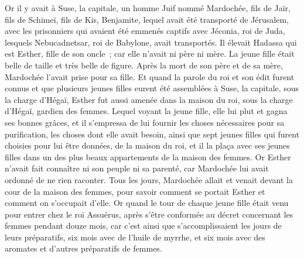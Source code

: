 \begin{multicols}{2}
Or il y avait à Suse, la capitale, un homme Juif nommé Mardochée, fils de Jaïr, fils de Schimeï, fils de Kis, Benjamite,
lequel avait été transporté de Jérusalem, avec les prisonniers qui avaient été emmenés captifs avec Jéconia, roi de Juda, lesquels Nebucadnetsar, roi de Babylone, avait transportés.
Il élevait Hadassa qui est Esther, fille de son oncle~; car elle n'avait ni père ni mère. La jeune fille était belle de taille et très belle de figure. Après la mort de son père et de sa mère, Mardochée l'avait prise pour sa fille.
Et quand la parole du roi et son édit furent connus et que plusieurs jeunes filles eurent été assemblées à Suse, la capitale, sous la charge d'Hégaï, Esther fut aussi amenée dans la maison du roi, sous la charge d'Hégaï, gardien des femmes.
Lequel voyant la jeune fille, elle lui plut et gagna ses bonnes grâces, et il s'empressa de lui fournir les choses nécessaires pour sa purification, les choses dont elle avait besoin, ainsi que sept jeunes filles qui furent choisies pour lui être données, de la maison du roi, et il la plaça avec ses jeunes filles dans un des plus beaux appartements de la maison des femmes.
Or Esther n'avait fait connaître ni son peuple ni sa parenté, car Mardochée lui avait ordonné de ne rien raconter.
Tous les jours, Mardochée allait et venait devant la cour de la maison des femmes, pour savoir comment se portait Esther et comment on s'occupait d'elle.
Or quand le tour de chaque jeune fille était venu pour entrer chez le roi Assuérus, après s'être conformée au décret concernant les femmes pendant douze mois, car c'est ainsi que s'accomplissaient les jours de leurs préparatifs, six mois avec de l'huile de myrrhe, et six mois avec des aromates et d'autres préparatifs de femmes.

\end{multicols}
